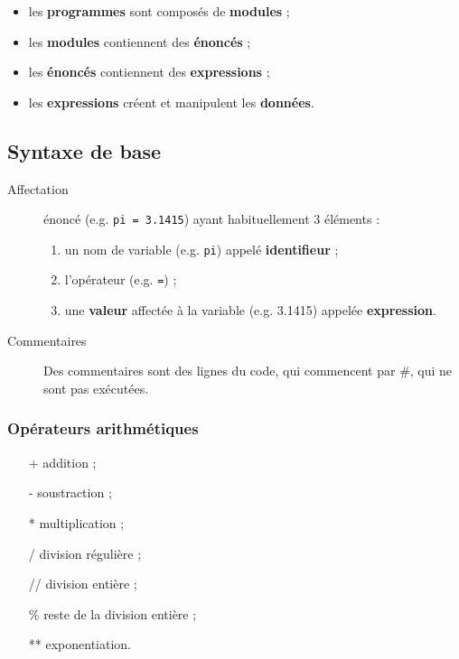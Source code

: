 \documentclass[10pt, french]{article}
\begin{document}
\begin{multicols*}{2}
\begin{definitionNOHFILLpropos}
\begin{itemize}
	\item	les \textbf{programmes} sont composés de \textbf{modules} ;        
	\item	les \textbf{modules} contiennent des \textbf{énoncés} ;            
	\item	les \textbf{énoncés} contiennent des \textbf{expressions} ;        
	\item	les \textbf{expressions} créent et manipulent les \textbf{données}.
\end{itemize}
\end{definitionNOHFILLpropos}



\subsection{Syntaxe de base}
\begin{description}
	\item[Affectation]	énoncé (e.g. \texttt{pi = 3.1415}) ayant habituellement 3 éléments :
		\begin{enumerate}[label = \rectangled{\arabic*}{lightgray}]
		\item	un nom de variable (e.g. \texttt{pi}) appelé \textbf{identifieur} ;
		\item	l'opérateur (e.g. \texttt{=}) ;
		\item	une \textbf{valeur} affectée à la variable (e.g. 3.1415) appelée \textbf{expression}.
		\end{enumerate}
	\item[Commentaires]	Des commentaires sont des lignes du code, qui commencent par \#, qui ne sont pas exécutées.
\end{description}
	
	
\subsubsection{Opérateurs arithmétiques}
\begin{itemize}[leftmargin = 5mm]
	\item[+]	addition ;
	\item[-]	soustraction ;
	\item[*]	multiplication ;
	\item[/]	division régulière ;
	\item[//]	division entière ;
	\item[\%]	reste de la division entière ;
	\item[**]	exponentiation.
\end{itemize}


\end{multicols*}
\end{document}
